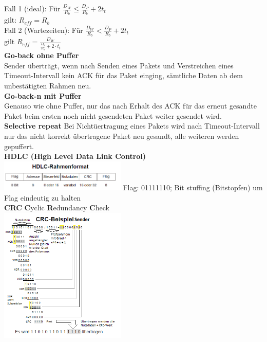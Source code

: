 \documentclass[fs, footer]{latex4ei}
\begin{document}
\begin{multicols*}{4}
{	Fall 1 (ideal): Für $\frac{D_W}{R_b}  \le \frac{D_P}{R_b} + 2t_t$ \\ gilt: $R_{eff} = R_b$ \\
	Fall 2 (Wartezeiten): Für $\frac{D_W}{R_b} < \frac{D_P}{R_b} + 2t_t$  \\ gilt $R_{eff} = \frac{D_W}{\frac{D_b}{R_b} + 2 \cdot t_t }$ \\ 
	

\textbf{Go-back ohne Puffer} \\
	Sender überträgt, wenn nach Senden eines Pakets und Verstreichen eines Timeout-Intervall kein ACK für das Paket einging, sämtliche Daten ab dem unbestätigten Rahmen neu. \\

\textbf{Go-back-n mit Puffer} \\
	Genauso wie ohne Puffer, nur das nach Erhalt des ACK für das erneut gesandte Paket beim ersten noch nicht gesendeten Paket weiter gesendet wird. \\
	
\textbf{Selective repeat}
	Bei Nichtüertragung eines Pakets wird nach Timeout-Intervall nur das nicht korrekt übertragene Paket neu gesandt, alle weiteren werden gepuffert. \\
	
\textbf{HDLC (High Level Data Link Control)} \\

	\includegraphics[width = 6cm]{./img/HDLC_Rahmen.png}
	 Flag: 01111110; Bit stuffing (Bitstopfen) um Flag eindeutig zu halten\\

\textbf{CRC} \textbf{C}yclic \textbf{R}edundancy \textbf{C}heck\\

\includegraphics[width = 6cm]{./img/CRC_Bsp.png}
}




\end{multicols*}
\end{document}
